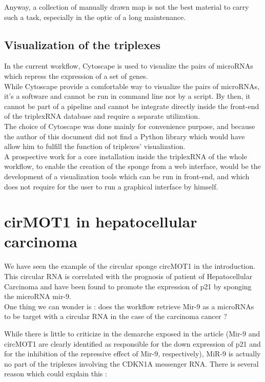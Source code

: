 \documentclass[a4paper,12pt]{report}
\begin{document}
Anyway, a collection of manually drawn map is not the best material to carry such a task, especially in the optic of a long maintenance.
 
\subsection{Visualization of the triplexes}

In the current workflow, Cytoscape\cite{cytoscape} is used to visualize the pairs of microRNAs which repress the expression of a set of genes.\\

While Cytoscape provide a comfortable way to visualize the pairs of microRNAs, it's a software and cannot be run in command line nor by a script. By then, it cannot be part of a pipeline and cannot be integrate directly inside the front-end of the triplexRNA database and require a separate utilization.\\ 

The choice of Cytoscape was done mainly for convenience purpose, and because the author of this document did not find a Python library which would have allow him to fulfill the function of triplexes' visualization. \\

A prospective work for a core installation inside the triplexRNA of the whole workflow, to enable the creation of the sponge from a web interface, would be the development of a visualization tools which can be run in front-end, and which does not require for the user to run a graphical interface by himself.

\section{cirMOT1 in hepatocellular carcinoma}

We have seen the example of the circular sponge circMOT1 in the introduction. This circular RNA is correlated with the prognosis of patient of Hepatocellular Carcinoma and have been found to promote the expression of p21 by sponging the microRNA mir-9.\\

One thing we can wonder is : does the workflow retrieve Mir-9 as a microRNAs to be target with a circular RNA in the case of the carcinoma cancer ?

While there is little to criticize in the demarche exposed in the article (Mir-9 and circMOT1 are clearly identified as responsible for the down expression of p21 and for the inhibition of the repressive effect of Mir-9, respectively), MiR-9 is actually no part of the triplexes involving the CDKN1A messenger RNA. There is several reason which could explain this :
\end{document}
